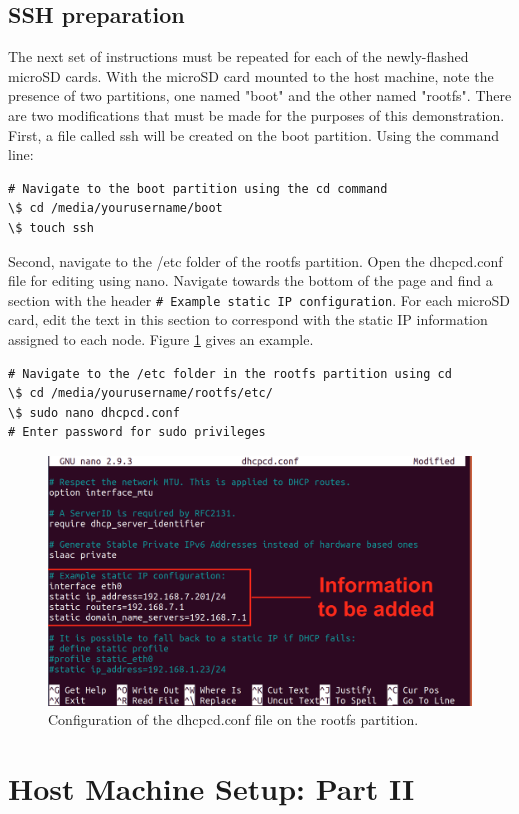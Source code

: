\documentclass[sigconf]{acmart}
\begin{document}
\subsection{SSH preparation}
The next set of instructions must be repeated for each of the newly-flashed microSD cards. With the microSD card mounted to the host machine, note the presence of two partitions, one named "boot" and the other named "rootfs". There are two modifications that must be made for the purposes of this demonstration. First, a file called ssh will be created on the boot partition. Using the command line:
\begin{lstlisting}
# Navigate to the boot partition using the cd command
\$ cd /media/yourusername/boot
\$ touch ssh
\end{lstlisting}
Second, navigate to the /etc folder of the rootfs partition. Open the dhcpcd.conf file for editing using nano. Navigate towards the bottom of the page and find a section with the header {\tt \# Example static IP configuration}. For each microSD card, edit the text in this section to correspond with the static IP information assigned to each node. Figure \ref{f:dhcpcd2} gives an example.
\begin{lstlisting}
# Navigate to the /etc folder in the rootfs partition using cd
\$ cd /media/yourusername/rootfs/etc/
\$ sudo nano dhcpcd.conf
# Enter password for sudo privileges 
\end{lstlisting}

\begin{figure}[!ht]
  \centering\includegraphics[width=\columnwidth]{images/dhcpcd2.png}
  \caption{Configuration of the dhcpcd.conf file on the rootfs partition.}\label{f:dhcpcd2}
\end{figure}

\section{Host Machine Setup: Part II}
\end{document}
